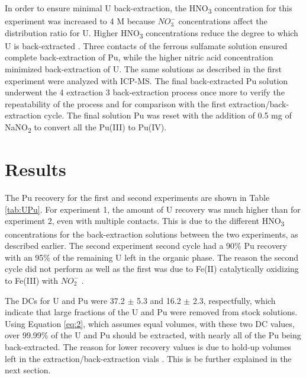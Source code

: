 \documentclass[review]{elsarticle}
\newcommand{\tsbs}{\textsubscript}
\begin{document}
 In order to ensure minimal U back-extraction, the HNO\tsbs{3} concentration for this experiment was increased to 4 M because $NO_3^-$ concentrations
affect the distribution ratio for U. Higher HNO\tsbs{3} concentrations reduce the degree to which
U is back-extracted \cite{stoller1961}. Three contacts of the ferrous sulfamate solution ensured
complete back-extraction of Pu, while the higher nitric acid concentration minimized back-extraction of U.
 The same solutions as described in the first experiment
were analyzed with ICP-MS.
The final back-extracted Pu solution underwent the 4 extraction 3 back-extraction process once more to
verify the repeatability of the process and for comparison
with the first extraction/back-extraction cycle. The final solution Pu was reset with the 
addition of 0.5 mg of NaNO\tsbs{2} to convert all the Pu(III) to Pu(IV).  


\section{Results}

The Pu recovery for the first and second experiments are shown in Table \ref{tab:UPu}.
For experiment 1, the amount of U recovery was much higher than for experiment 2, even with multiple 
contacts. This is due to the different HNO\tsbs{3} concentrations for the back-extraction solutions
between the two experiments, as described earlier.
The second experiment second cycle had a 90\% Pu recovery with 
an 95\% of the remaining U left in the organic phase. The reason the second cycle did not perform as well
as the first was due to Fe(II) catalytically oxidizing to Fe(III) with $NO_2^-$ \cite{stoller1961}.

The DCs for U and Pu were 37.2 $\pm$ 5.3 and 16.2 $\pm$ 2.3, respectfully,
which indicate that large fractions of the U and Pu were removed from stock solutions. 
Using Equation \ref{eq:2}, which assumes equal volumes,
 with these two DC values, over 99.99\% of the U and Pu should be
extracted, with nearly all of the Pu being back-extracted. The reason for lower recovery values
is due to hold-up volumes left in the extraction/back-extraction vials \cite{long1967}.
This is be further explained in the next section. 
\end{document}
